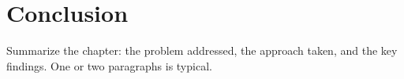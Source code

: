 \section{Conclusion}
\label{sec:example-one-conclusion}

Summarize the chapter: the problem addressed, the approach taken, and
the key findings.  One or two paragraphs is typical.
